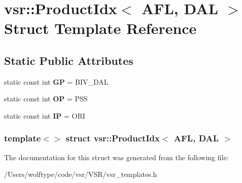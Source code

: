 \hypertarget{structvsr_1_1_product_idx_3_01_a_f_l_00_01_d_a_l_01_4}{\section{vsr\-:\-:Product\-Idx$<$ A\-F\-L, D\-A\-L $>$ Struct Template Reference}
\label{structvsr_1_1_product_idx_3_01_a_f_l_00_01_d_a_l_01_4}
}
\subsection*{Static Public Attributes}
\begin{DoxyCompactItemize}
\item 
\hypertarget{structvsr_1_1_product_idx_3_01_a_f_l_00_01_d_a_l_01_4_ac9a2a6c122005fb0a5a9eddee1feeb5d}{static const int {\bfseries G\-P} = B\-I\-V\-\_\-\-D\-A\-L}\label{structvsr_1_1_product_idx_3_01_a_f_l_00_01_d_a_l_01_4_ac9a2a6c122005fb0a5a9eddee1feeb5d}

\item 
\hypertarget{structvsr_1_1_product_idx_3_01_a_f_l_00_01_d_a_l_01_4_a0841036333d0116f0cbf9dc7b0ef413f}{static const int {\bfseries O\-P} = P\-S\-S}\label{structvsr_1_1_product_idx_3_01_a_f_l_00_01_d_a_l_01_4_a0841036333d0116f0cbf9dc7b0ef413f}

\item 
\hypertarget{structvsr_1_1_product_idx_3_01_a_f_l_00_01_d_a_l_01_4_a3c8d90b2a44c8dece5136e2214a41fab}{static const int {\bfseries I\-P} = O\-R\-I}\label{structvsr_1_1_product_idx_3_01_a_f_l_00_01_d_a_l_01_4_a3c8d90b2a44c8dece5136e2214a41fab}

\end{DoxyCompactItemize}
\subsubsection*{template$<$$>$ struct vsr\-::\-Product\-Idx$<$ A\-F\-L, D\-A\-L $>$}



The documentation for this struct was generated from the following file\-:\begin{DoxyCompactItemize}
\item 
/\-Users/wolftype/code/vsr/\-V\-S\-R/vsr\-\_\-templates.\-h\end{DoxyCompactItemize}
